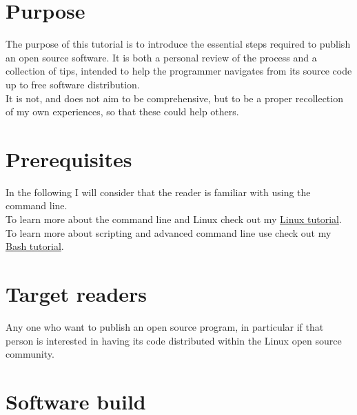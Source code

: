 \documentclass{./these-seb}
\begin{document}
\section*{Purpose}

The purpose of this tutorial is to introduce the essential steps required to publish an open source software. 
It is both a personal review of the process and a collection of tips, intended to help the programmer navigates from its source code up to free software distribution. \\
It is not, and does not aim to be comprehensive, but to be a proper recollection of my own experiences, so that these could help others. 

\section*{Prerequisites}


In the following I will consider that the reader is familiar with using the command line. \\
To learn more about the command line and Linux check out my \href{https://www.ipcms.fr/wp-content/uploads/2021/11/linux.pdf}{Linux tutorial}. \\
To learn more about scripting and advanced command line use check out my \href{https://www.ipcms.fr/wp-content/uploads/2021/05/bash.pdf}{Bash tutorial}. 

\section*{Target readers}

Any one who want to publish an open source program, in particular if that person is interested in having its code distributed within the Linux open source community. 

\newpage

\section*{Software build}
\end{document}
